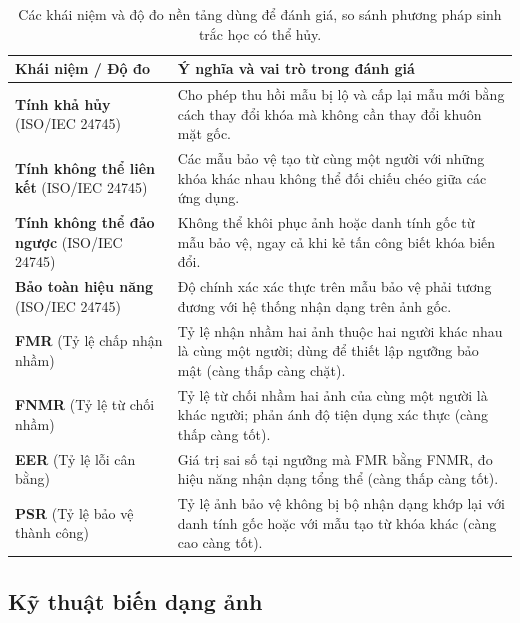 \documentclass[oneside,a4paper,12pt]{extarticle}
\begin{document}
\begin{table}[H]
\centering
\caption[Các khái niệm và độ đo nền tảng về sinh trắc học có thể hủy]{Các khái niệm và độ đo nền tảng dùng để đánh giá, so sánh phương pháp sinh trắc học có thể hủy.}
\label{tab:core-concepts}
\begin{spacing}{1.08}
\footnotesize
\setlength{\tabcolsep}{4pt}
\begin{tabular}{@{}P{4.4cm}P{10.6cm}@{}}
\toprule
\textbf{Khái niệm / Độ đo} & \textbf{Ý nghĩa và vai trò trong đánh giá} \\
\midrule
\textbf{Tính khả hủy} (ISO/IEC 24745) & Cho phép thu hồi mẫu bị lộ và cấp lại mẫu mới bằng cách thay đổi khóa mà không cần thay đổi khuôn mặt gốc. \\
\addlinespace[3pt]
\textbf{Tính không thể liên kết} (ISO/IEC 24745) & Các mẫu bảo vệ tạo từ cùng một người với những khóa khác nhau không thể đối chiếu chéo giữa các ứng dụng. \\
\addlinespace[3pt]
\textbf{Tính không thể đảo ngược} (ISO/IEC 24745) & Không thể khôi phục ảnh hoặc danh tính gốc từ mẫu bảo vệ, ngay cả khi kẻ tấn công biết khóa biến đổi. \\
\addlinespace[3pt]
\textbf{Bảo toàn hiệu năng} (ISO/IEC 24745) & Độ chính xác xác thực trên mẫu bảo vệ phải tương đương với hệ thống nhận dạng trên ảnh gốc. \\
\midrule
\textbf{FMR} (Tỷ lệ chấp nhận nhầm) & Tỷ lệ nhận nhầm hai ảnh thuộc hai người khác nhau là cùng một người; dùng để thiết lập ngưỡng bảo mật (càng thấp càng chặt). \\
\addlinespace[3pt]
\textbf{FNMR} (Tỷ lệ từ chối nhầm) & Tỷ lệ từ chối nhầm hai ảnh của cùng một người là khác người; phản ánh độ tiện dụng xác thực (càng thấp càng tốt). \\
\addlinespace[3pt]
\textbf{EER} (Tỷ lệ lỗi cân bằng) & Giá trị sai số tại ngưỡng mà FMR bằng FNMR, đo hiệu năng nhận dạng tổng thể (càng thấp càng tốt). \\
\addlinespace[3pt]
\textbf{PSR} (Tỷ lệ bảo vệ thành công) & Tỷ lệ ảnh bảo vệ không bị bộ nhận dạng khớp lại với danh tính gốc hoặc với mẫu tạo từ khóa khác (càng cao càng tốt). \\
\bottomrule
\end{tabular}
\end{spacing}
\end{table}

\subsection{Kỹ thuật biến dạng ảnh}
\label{sec:ky-thuat-chuong-sach}
\end{document}
